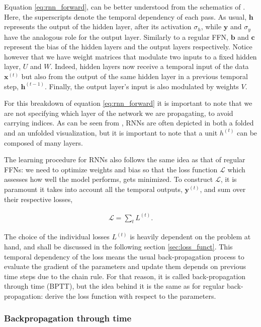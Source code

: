 \twocolumngrid

Equation \eqref{eq:rnn_forward},  can be better understood from the schematics of . Here, the superscripts denote the temporal dependency of each pass. As usual, $\mathbf{h}$ represents the output of the hidden layer, after its activation $\sigma_h$, while $\mathbf{y}$ and $\sigma_y$ have the analogous role for the output layer. Similarly to a regular FFN, $\mathbf{b} $ and $\mathbf{c}$ represent the bias of the hidden layers and the output layers respectively. Notice however that we have weight matrices that modulate two inputs to a fixed hidden layer, $U$ and $W$. Indeed, hidden layers now receive a temporal input of the data $\mathbf{x}^{(t)}$ but also from the output of the same hidden layer in a previous temporal step, $\mathbf{h}^{(t-1)}$. Finally, the output layer's input is also modulated by weights $V$.

For this breakdown of equation \eqref{eq:rnn_forward} it is important to note that we are not specifying which layer of the network we are propagating, to avoid carrying indices. As can be seen from , RNNs are often depicted in both a folded and an unfolded visualization, but it is important to note that a unit $h^{(t)}$ can be composed of many layers.

The learning procedure for RNNs also follows the same idea as that of regular FFNs: we need to optimize weights and bias so that the loss function $\mathcal{L}$ which assesses how well the model performs, gets minimized. To construct $\mathcal{L}$, it is paramount it takes into account all the temporal outputs, $\mathbf{y}^{(t)}$, and sum over their respective losses,

\begin{align}
    \mathcal{L}= \sum_t L^{(t)}.
    \label{eq:loss_rnn}
\end{align}

The choice of the individual losses $L^{(t)}$ is heavily dependent on the problem at hand, and shall be discussed in the following section \ref{sec:loss_funct}. This temporal dependency of the loss means the usual back-propagation process to evaluate the gradient of the parameters and update them depends on previous time steps due to the chain rule. For that reason, it is called back-propagation through time (BPTT), but the idea behind it is the same as for regular back-propagation: derive the loss function with respect to the parameters.

\subsubsection{Backpropagation through time}

